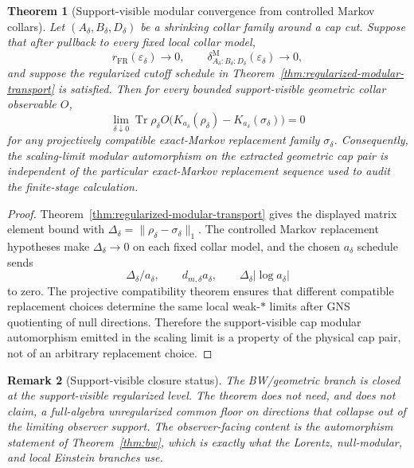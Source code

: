 \documentclass[11pt]{article}
\newtheorem{theorem}{Theorem}[section]
\newtheorem{remark}[theorem]{Remark}
\begin{document}
\begin{theorem}[Support-visible modular convergence from controlled Markov collars]\label{thm:support-visible-modular-convergence}
Let \((A_\delta,B_\delta,D_\delta)\) be a shrinking collar family around a cap
cut. Suppose that after pullback to every fixed local collar model,
\[
r_{\mathrm{FR}}(\varepsilon_\delta)\to0,\qquad
\delta^{\mathrm M}_{A_\delta:B_\delta:D_\delta}(\varepsilon_\delta)\to0,
\]
and suppose the regularized cutoff schedule in
Theorem~\ref{thm:regularized-modular-transport} is satisfied. Then for every
bounded support-visible geometric collar observable \(O\),
\[
\lim_{\delta\downarrow0}
\operatorname{Tr}\rho_\delta O
\bigl(
K_{a_\delta}(\rho_\delta)-K_{a_\delta}(\sigma_\delta)
\bigr)
=0
\]
for any projectively compatible exact-Markov replacement family
\(\sigma_\delta\). Consequently, the scaling-limit modular automorphism on the
extracted geometric cap pair is independent of the particular exact-Markov
replacement sequence used to audit the finite-stage calculation.
\end{theorem}

\begin{proof}
Theorem~\ref{thm:regularized-modular-transport} gives the displayed matrix
element bound with
\(\Delta_\delta=\|\rho_\delta-\sigma_\delta\|_1\). The controlled Markov
replacement hypotheses make \(\Delta_\delta\to0\) on each fixed collar model,
and the chosen \(a_\delta\) schedule sends
\[
\Delta_\delta/a_\delta,\qquad
d_{m,\delta}a_\delta,\qquad
\Delta_\delta|\log a_\delta|
\]
to zero. The projective compatibility theorem ensures that different
compatible replacement choices determine the same local weak-\(*\) limits after
GNS quotienting of null directions. Therefore the support-visible cap modular
automorphism emitted in the scaling limit is a property of the physical cap
pair, not of an arbitrary replacement choice.
\end{proof}

\begin{remark}[Support-visible closure status]
The BW/geometric branch is closed at the support-visible regularized level. The theorem does not need, and does not claim, a full-algebra unregularized common floor on directions that collapse out of the limiting observer support. The observer-facing content is the automorphism statement of Theorem~\ref{thm:bw}, which is exactly what the Lorentz, null-modular, and local Einstein branches use.
\end{remark}
\end{document}
